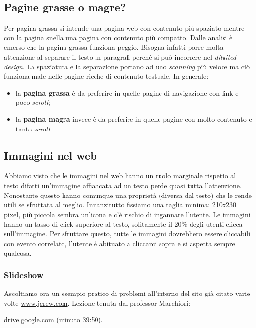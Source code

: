		\subsection{Pagine grasse o magre?}
			Per pagina grassa si intende una pagina web con contenuto più spaziato mentre con la pagina snella una pagina con contenuto più compatto. Dalle analisi è emerso che la pagina grassa funziona peggio. Bisogna infatti porre molta attenzione al separare il testo in paragrafi perché si può incorrere nel \emph{diluited design}. La spaziatura e la separazione portano ad uno \emph{scanning} più veloce ma ciò funziona male nelle pagine ricche di contenuto testuale. In generale:
			\begin{itemize}
				\item la \textbf{pagina grassa} è da preferire in quelle pagine di navigazione con link e poco \emph{scroll};
				\item la \textbf{pagina magra} invece è da preferire in quelle pagine con molto contenuto e tanto \emph{scroll}.
			\end{itemize}
		
		\subsection{Immagini nel web}
			Abbiamo visto che le immagini nel web hanno un ruolo marginale rispetto al testo difatti un'immagine affiancata ad un testo perde quasi tutta l'attenzione. Nonostante questo hanno comunque una proprietà (diversa dal testo) che le rende utili se sfruttata al meglio. Innanzitutto fissiamo una taglia minima: 210x230 pixel, più piccola sembra un'icona e c'è rischio di ingannare l'utente. Le immagini hanno un tasso di click superiore al testo, solitamente il 20\% degli utenti clicca sull'immagine. Per sfruttare questo, tutte le immagini dovrebbero essere cliccabili con evento correlato, l'utente è abituato a cliccarci sopra e si aspetta sempre qualcosa.
			
			\subsubsection{Slideshow}
				Ascoltiamo ora un esempio pratico di problemi all'interno del sito già citato varie volte \href{http://www.jcrew.com}{www.jcrew.com}.
				Lezione tenuta dal professor Marchiori: 
								
				\href{https://drive.google.com/open?id=0B3-HN4UsFMNfRHZWZDVRaWh0U1E}{drive.google.com} (minuto 39:50).
			
